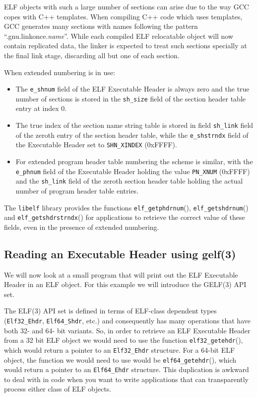 \documentclass[a4paper]{report}
\newcommand{\constant}[1]{\texttt{#1}}
\newcommand{\function}[1]{\texttt{#1}()}
\newcommand{\library}[1]{\texttt{#1}}
\newcommand{\parameter}[1]{\texttt{#1}}
\newcommand{\type}[1]{\texttt{#1}}
\begin{document}
ELF objects with such a large number of sections can arise due to the
way GCC copes with C++ templates.  When compiling C++ code which uses
templates, GCC generates many sections with names following the
pattern ``.gnu.linkonce.\textit{name}''.  While each compiled ELF
relocatable object will now contain replicated data, the linker is
expected to treat such sections specially at the final link stage,
discarding all but one of each section.

When extended numbering is in use:

\begin{itemize}
\item The \parameter{e\_shnum} field of the ELF Executable Header is
  always zero and the true number of sections is stored in the
  \parameter{sh\_size} field of the section header table entry at
  index 0.
\item The true index of the section name string table is stored in
  field \parameter{sh\_link} field of the zeroth entry of the section
  header table, while the \parameter{e\_shstrndx} field of the
  Executable Header set to \constant{SHN\_XINDEX} (0xFFFF).
\item For extended program header table numbering the scheme is similar,
  with the \parameter{e\_phnum} field of the Executable Header holding
  the value \constant{PN\_XNUM} (0xFFFF) and the
  \parameter{sh\_link} field of the zeroth section header table holding
  the actual number of program header table entries.
\end{itemize}

The \library{libelf} library provides the functions
\function{elf\_getphdrnum}, \function{elf\_getshdrnum} and
\function{elf\_getshdrstrndx} for applications to retrieve the correct
value of these fields, even in the presence of extended numbering.

\subsection{Reading an Executable Header using gelf(3)}

We will now look at a small program that will print out the ELF
Executable Header in an ELF object. For this example we will introduce
the GELF(3) API set.

The ELF(3) API set is defined in terms of ELF-class dependent types
(\type{Elf32\_Ehdr}, \type{Elf64\_Shdr}, etc.) and consequently has
many operations that have both 32- and 64- bit variants.  So, in order
to retrieve an ELF Executable Header from a 32 bit ELF object we would
need to use the function \function{elf32\_getehdr}, which would return
a pointer to an \type{Elf32\_Ehdr} structure.  For a 64-bit ELF
object, the function we would need to use would be
\function{elf64\_getehdr}, which would return a pointer to an
\type{Elf64\_Ehdr} structure.  This duplication is awkward to deal
with in code when you want to write applications that can
transparently process either class of ELF objects.
\end{document}
